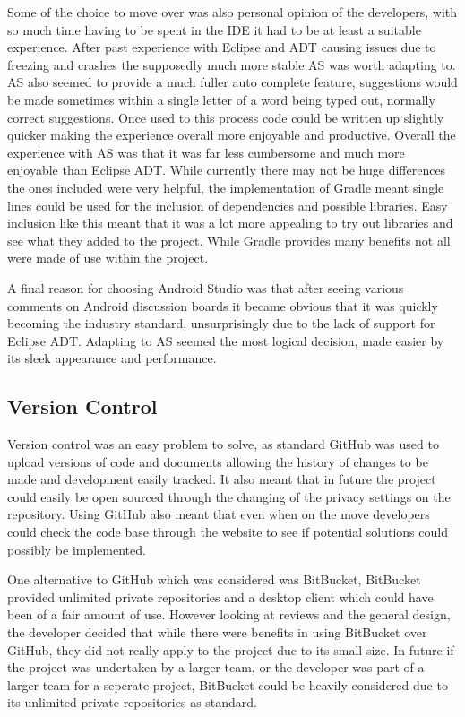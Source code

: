 Some of the choice to move over was also personal opinion of the developers, with so much time having to be spent in the IDE it had to be at least a suitable experience. After past experience with Eclipse and ADT causing issues due to freezing and crashes the supposedly much more stable AS was worth adapting to. AS also seemed to provide a much fuller auto complete feature, suggestions would be made sometimes within a single letter of a word being typed out, normally correct suggestions. Once used to this process code could be written up slightly quicker making the experience overall more enjoyable and productive. Overall the experience with AS was that it was far less cumbersome and much more enjoyable than  Eclipse ADT. While currently there may not be huge differences the ones included were very helpful, the implementation of Gradle meant single lines could be used for the inclusion of dependencies and possible libraries. Easy inclusion like this meant that it was a lot more appealing to try out libraries and see what they added to the project. While Gradle provides many benefits not all were made of use within the project. 

A final reason for choosing Android Studio was that after seeing various comments on Android discussion boards it became obvious that it was quickly becoming the industry standard, unsurprisingly due to the lack of support for Eclipse ADT. Adapting to AS seemed the most logical decision, made easier by its sleek appearance and performance. 
\subsection{Version Control}
Version control was an easy problem to solve, as standard GitHub was used to upload versions of code and documents allowing the history of changes to be made and development easily tracked. It also meant that in future the project could easily be open sourced through the changing of the privacy settings on the repository. Using GitHub also meant that even when on the move developers could check the code base through the website to see if potential solutions could possibly be implemented. 

One alternative to GitHub which was considered was BitBucket, BitBucket provided unlimited private repositories and a desktop client which could have been of a fair amount of use. However looking at reviews and the general design, the developer decided that while there were benefits in using BitBucket over GitHub, they did not really apply to the project due to its small size. In future if the project was undertaken by a larger team, or the developer was part of a larger team for a seperate project, BitBucket could be heavily considered due to its unlimited private repositories as standard. 

